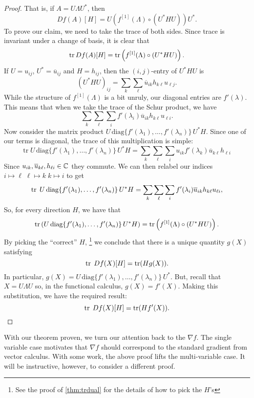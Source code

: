 \begin{proof}
That is, if $A = U   \Lambda U ^{*} $, then
\[
  Df(A)[H] = U \left( f ^{[1]} (\Lambda) \circ (U ^{* } H U) \right)U ^{*}.
\]
%
To prove our claim, we need to take the trace of both sides. Since trace is
invariant under a change of basis, it is clear that
\[
  \operatorname{tr} Df(A)[H] = \operatorname{tr} \left( f ^{[1]} (\Lambda) \circ (U ^{* } H U) \right).
\]
If $U = u_{ij}$, $U ^{*} = \overline{u}_{ij}$ and $H = h_{ij}$, then the
$(i,j)$-entry of $U ^{*}HU$ is
\[
  {(U ^{* } H U)}_{ij} = \sum_k\sum_\ell \overline{u}_{ik}h_{k\ell}u_{\ell j}.
\]
While the structure of
$f ^{[1]} (\Lambda)$ is a bit unruly, our diagonal entries are $f'(\lambda)$.
This means that when we take the trace of the Schur product, we have
\[
 \sum_k\sum_\ell \sum_i f'(\lambda_i)\overline{u}_{ik}h_{k\ell}u_{\ell i}.
\]
Now consider the matrix product
$U\, \text{diag} \{f'(\lambda_1), \dots ,f'(\lambda_n)\} \,U ^{*} H $. Since one of our terms
is diagonal, the trace of this multiplication is simple:
\[
  \text{tr}\; U \,\text{diag} \{f'(\lambda_1), \dots ,f'(\lambda_n)\}\, U ^{*} H
  = \sum_k\sum_\ell\sum_i  u_{ik}f'(\lambda_k) \overline{u}_{k \ell} h_{\ell i}
\]
Since \(u_{ik}, \overline{u}_{k\ell}, h_{\ell i} \in \mathbb{C} \) they commute. We can
then relabel our indices
$i \mapsto \ell\; \ell \mapsto k \; k \mapsto i $ to get
\[
  \operatorname{tr}\; U \,\text{diag} \{f'(\lambda_1), \dots ,f'(\lambda_n)\}\, U ^{*} H
  = \sum_k\sum_\ell \sum_i f'(\lambda_i) \overline{u}_{i k} h_{k \ell}u_{\ell i},
\]
So, for every direction \(H\), we have that
\[
  \operatorname{tr} \left( U\, \text{diag} \{f'(\lambda_1), \dots ,f'(\lambda_n)\} \,U ^{*} H\right) =
  \operatorname{tr} \left( f ^{[1]} (\Lambda) \circ (U ^{* } H U) \right).
\]
By picking the ``correct'' \(H\),
\footnote{See the proof of \ref{thm:trdual} for the details of how to pick the
  \(H\)'s}
we conclude that there is a unique quantity \(g(X)\) satisfying
\[
  \operatorname{tr} \;Df(X)[H] = \operatorname{tr}(Hg(X)).
\]
In particular,
\( g(X) = U\, \text{diag} \{f'(\lambda_1), \dots ,f'(\lambda_n)\} \,U ^{*} \). But,
recall that \(X=U\Lambda U\) so, in the functional calculus, $g(X) = f'(X)$.
Making this substitution, we have the required result:
\[
  \operatorname{tr} \; Df(X)[H] = \operatorname{tr} (H f'(X)).
\]
\end{proof}

With our theorem proven, we turn our attention back to the \(\nabla f\). The
single variable case motivates that \(\nabla f\) should correspond to the
standard gradient from vector calculus. With some work, the above proof lifts
the multi-variable case. {\color{red}  It will be instructive, however, to consider a
different proof.}

